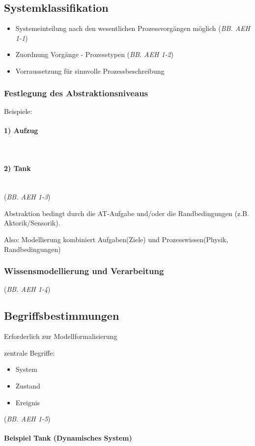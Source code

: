 \documentclass[12pt,a4paper]{scrartcl}
\numberwithin{equation}{section}
\newcommand{\properparagraph}[1]{\paragraph{#1}\mbox{}\\}
\begin{document}
\subsection{Systemklassifikation}
\begin{itemize}
\item Systemeinteilung nach den wesentlichen Prozessvorgängen möglich (\textit{BB. AEH 1-1})
\item Zuordnung Vorgänge - Prozesstypen (\textit{BB. AEH 1-2})
\item Vorraussetzung für sinnvolle Prozessbeschreibung
\end{itemize}

\subsubsection{Festlegung des Abstraktionsniveaus}
Beispiele:

\properparagraph{1) Aufzug}

\properparagraph{2) Tank}
(\textit{BB. AEH 1-3})

Abstraktion bedingt durch die AT-Aufgabe und/oder die Randbedingungen (z.B. Aktorik/Sensorik).

Also: Modellierung kombiniert Aufgaben(Ziele) und Prozesswissen(Physik, Randbedingungen)

\subsubsection{Wissensmodellierung und Verarbeitung}
(\textit{BB. AEH 1-4})

\subsection{Begriffsbestimmungen}
Erforderlich zur Modellformalisierung

zentrale Begriffe:
\begin{itemize}
	\item System 
	\item Zustand
	\item Ereignis 
\end{itemize}

(\textit{BB. AEH 1-5})

\properparagraph{Beispiel Tank (Dynamisches System)}

\end{document}
